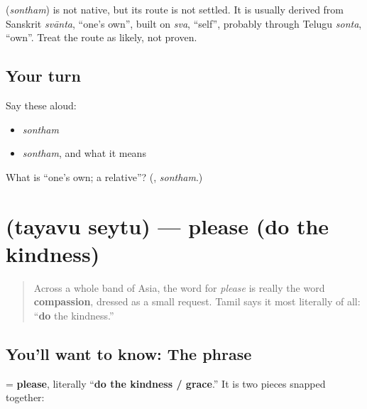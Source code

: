 \begin{cousinweb}
\textbf{} (\emph{sontham}) is not native, but its route is not settled. It is usually derived from Sanskrit \emph{svānta}, \textquotedblleft{}one's own\textquotedblright{}, built on \emph{sva}, \textquotedblleft{}self\textquotedblright{}, probably through Telugu \emph{sonta}, \textquotedblleft{}own\textquotedblright{}. Treat the route as likely, not proven.
\end{cousinweb}

\subsection*{Your turn}
Say these aloud:

\begin{itemize}
\raggedright
  \item \emph{sontham}
  \item \emph{sontham}, and what it means
\end{itemize}

\begin{tcolorbox}[breakable,colback=teal!4,colframe=teal!35!black,title={Before you move on}]
What is \textquotedblleft{}one's own; a relative\textquotedblright{}? (\textbf{}, \emph{sontham}.)
\end{tcolorbox}
\section[\texorpdfstring{\ta{தயவுசெய்து} (tayavu seytu)}{தயவுசெய்து (tayavu seytu)}]{ (tayavu seytu) — please (do the kindness)}

\label{lesson:TA-C08-tayavuseytu}



\begin{quote}
Across a whole band of Asia, the word for \emph{please} is really the word \textbf{compassion}, dressed as a small request. Tamil says it most literally of all: \textquotedblleft{}\textbf{do} the kindness.\textquotedblright{}
\end{quote}

\subsection*{You'll want to know: The phrase}
\textbf{} = \textbf{please}, literally \textquotedblleft{}\textbf{do the kindness / grace}.\textquotedblright{} It is two pieces snapped together:

